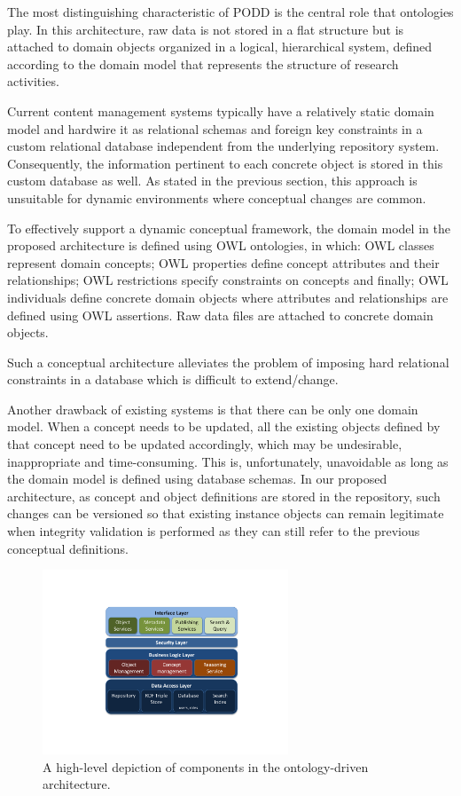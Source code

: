 \documentclass{llncs}
\begin{document}
The most distinguishing characteristic of PODD is the central role that
ontologies play. In this architecture, raw data is not stored in a flat
structure but is attached to domain objects organized in a logical,
hierarchical system, defined according to the domain model that
represents the structure of research activities.

Current content management systems typically have a
relatively static domain model and hardwire it as relational schemas
and foreign key constraints in a custom relational database independent
from the underlying repository system. Consequently, the information
pertinent to each concrete object is stored in this custom database as
well. As stated in the previous section, this approach is unsuitable
for dynamic environments where conceptual changes are common.

To effectively support a dynamic conceptual framework, the domain model
in the proposed architecture is defined using OWL ontologies, in which:
OWL classes represent domain concepts; OWL properties define concept
attributes and their relationships; OWL restrictions specify
constraints on concepts and finally; OWL individuals define concrete
domain objects where attributes and relationships are defined using OWL
assertions. Raw data files are attached to concrete domain objects.

Such a conceptual architecture alleviates the problem of imposing hard
relational constraints in a database which is difficult to
extend/change.

Another drawback of existing systems is that there can be only one
domain model. When a concept needs to be updated, all the existing
objects defined by that concept need to be updated accordingly, which
may be undesirable, inappropriate and time-consuming. This is,
unfortunately, unavoidable as long as the domain model is defined using
database schemas. In our proposed architecture, as concept and object
definitions are stored in the repository, such changes can be versioned
so that existing instance objects can remain legitimate when integrity
validation is performed as they can still refer to the previous
conceptual definitions.

\begin{figure}[htb]
\centering
\includegraphics[trim = 60mm 30mm 50mm 38mm, clip,height=55mm]{architecture.pdf}
\vspace{-16pt} \caption{A high-level depiction of components in the
ontology-driven architecture.}\label{fig:arch}
\end{figure}
\end{document}
